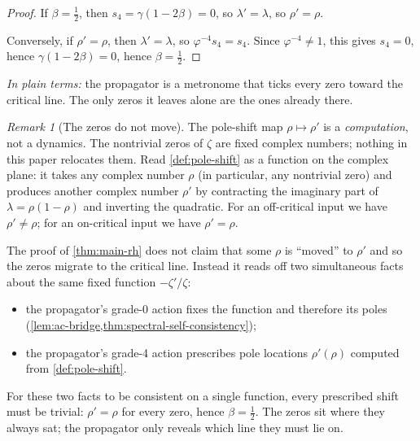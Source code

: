 \documentclass[11pt,a4paper]{article}
\theoremstyle{plain}
\theoremstyle{definition}
\theoremstyle{remark}
\newtheorem{remark}[theorem]{Remark}
\numberwithin{equation}{section}
\newcommand{\vp}{\varphi}
\begin{document}
\begin{proof}
If \(\beta=\tfrac12\), then \(s_4=\gamma(1-2\beta)=0\), so
\(\lambda'=\lambda\), so \(\rho'=\rho\).

Conversely, if \(\rho'=\rho\), then \(\lambda'=\lambda\), so
\(\vp^{-4}s_4=s_4\).  Since \(\vp^{-4}\ne1\), this gives
\(s_4=0\), hence \(\gamma(1-2\beta)=0\), hence \(\beta=\tfrac12\).
\end{proof}

\noindent\emph{In plain terms:} the propagator is a metronome that
ticks every zero toward the critical line.  The only zeros it leaves
alone are the ones already there.

\begin{remark}[The zeros do not move]
\label{rmk:zeros-do-not-move}
The pole-shift map \(\rho\mapsto\rho'\) is a \emph{computation},
not a dynamics.  The nontrivial zeros of \(\zeta\) are fixed
complex numbers; nothing in this paper relocates them.  Read
\cref{def:pole-shift} as a function on the complex plane: it
takes any complex number \(\rho\) (in particular, any nontrivial
zero) and produces another complex number \(\rho'\) by contracting
the imaginary part of \(\lambda=\rho(1-\rho)\) and inverting the
quadratic.  For an off-critical input we have \(\rho'\ne\rho\); for
an on-critical input we have \(\rho'=\rho\).

The proof of \cref{thm:main-rh} does not claim that some \(\rho\) is
``moved'' to \(\rho'\) and so the zeros migrate to the critical
line.  Instead it reads off two simultaneous facts about the same
fixed function \(-\zeta'/\zeta\):
\begin{itemize}
  \item the propagator's grade-0 action fixes the function and
    therefore its poles
    (\cref{lem:ac-bridge,thm:spectral-self-consistency});
  \item the propagator's grade-4 action prescribes pole locations
    \(\rho'(\rho)\) computed from \cref{def:pole-shift}.
\end{itemize}
For these two facts to be consistent on a single function, every
prescribed shift must be trivial: \(\rho'=\rho\) for every zero,
hence \(\beta=\tfrac12\).  The zeros sit where they always sat;
the propagator only reveals which line they must lie on.
\end{remark}
\end{document}
